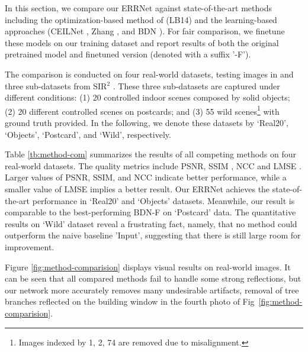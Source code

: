 \documentclass[10pt,twocolumn,letterpaper]{article}
\begin{document}
In this section, we compare our ERRNet against state-of-the-art methods including the
optimization-based method of \cite{Li2014Single} (LB14) and the learning-based approaches
(CEILNet \cite{fan2017generic}, Zhang \etal \cite{zhang2018single}, and 
BDN \cite{eccv18refrmv}). For fair comparison, we
finetune these models on our training dataset and report results of both
the original pretrained model and finetuned version (denoted with a suffix '-F').

The comparison is conducted on four real-world datasets,
 testing images in \cite{zhang2018single} and three sub-datasets from
SIR$^2$ \cite{Wan_2017_ICCV}. 
These three sub-datasets are 
captured under different conditions: (1) 20 controlled indoor scenes composed by
solid objects; (2) 20 different controlled scenes on postcards; and (3)
55 wild
scenes\footnote{Images indexed by 1, 2, 74 are removed due to misalignment.} with ground truth provided. In the following, we denote these datasets by `Real20', `Objects', `Postcard', and `Wild', respectively.








Table \ref{tb:method-com} summarizes the results of all competing
methods on four real-world datasets. The quality metrics include PSNR, SSIM \cite{wang2004image}, NCC
\cite{Xue2015ObstructionFree,Wan_2017_ICCV} and LMSE \cite{grosse2009ground}.
Larger values of PSNR, SSIM, and NCC indicate better performance, while a smaller value of LMSE implies a better result. Our ERRNet achieves the state-of-the-art
performance in `Real20' and `Objects' datasets. Meanwhile, our result is
comparable to the best-performing BDN-F on `Postcard' data. The quantitative
results on `Wild' dataset reveal a frustrating fact, namely, that no method
could outperform the naive baseline 'Input', suggesting that there is still large room
for improvement.

Figure \ref{fig:method-comparision} displays visual results on real-world
images. It can be seen that all compared methods fail to handle some strong
reflections, but our network more accurately removes many undesirable artifacts,
\eg removal of tree branches reflected on the building window in the fourth photo of Fig~\ref{fig:method-comparision}.
\end{document}
